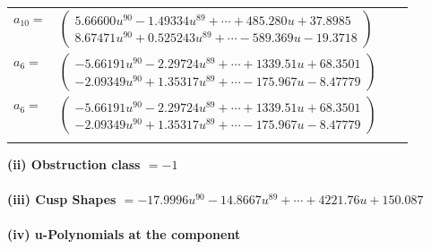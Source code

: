 \documentclass[1p]{elsarticle_modified}
\theoremstyle{definition}
\begin{document}
\begin{tabular}{m{7pt} m{180pt} m{7pt} m{180pt} }
\flushright $a_{10}=$&$\begin{pmatrix}5.66600 u^{90}-1.49334 u^{89}+\cdots+485.280 u+37.8985\\8.67471 u^{90}+0.525243 u^{89}+\cdots-589.369 u-19.3718\end{pmatrix}$ \\
\flushright $a_{6}=$&$\begin{pmatrix}-5.66191 u^{90}-2.29724 u^{89}+\cdots+1339.51 u+68.3501\\-2.09349 u^{90}+1.35317 u^{89}+\cdots-175.967 u-8.47779\end{pmatrix}$\\ \flushright $a_{6}=$&$\begin{pmatrix}-5.66191 u^{90}-2.29724 u^{89}+\cdots+1339.51 u+68.3501\\-2.09349 u^{90}+1.35317 u^{89}+\cdots-175.967 u-8.47779\end{pmatrix}$\\&\end{tabular}
\flushleft \textbf{(ii) Obstruction class $= -1$}\\~\\
\flushleft \textbf{(iii) Cusp Shapes $= -17.9996 u^{90}-14.8667 u^{89}+\cdots+4221.76 u+150.087$}\\~\\
\newpage\renewcommand{\arraystretch}{1}
\flushleft \textbf{(iv) u-Polynomials at the component}\newline \\
\end{document}
